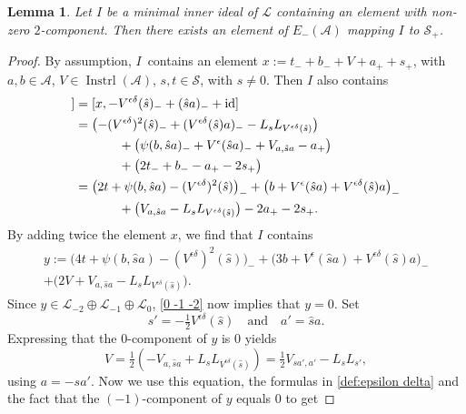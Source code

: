 \documentclass[oneside,a4paper]{amsart} %
\newtheorem{lemma}[theorem]{Lemma}
\theoremstyle{definition}
\DeclareMathOperator{\Inst}{Instrl}
\DeclareMathOperator{\id}{id}
\newcommand{\A}{\mathcal{A}}
\renewcommand{\SS}{\mathcal{S}}
\newcommand{\LL}{\mathcal{L}}
\numberwithin{equation}{section}
\begin{document}
\begin{lemma}
\label{-2 -1 0 1 2}
	Let $I$ be a minimal inner ideal of $\LL$ containing an element with non-zero $2$-component. Then there exists an element of $E_{-}(\A)$ mapping $I$ to $\SS_+$.
\end{lemma}
\begin{proof}
	By assumption, $I$~contains an element $x := t_- + b_- + V + a_+ + s_+$, with $a,b\in \A$, $V\in\Inst(\A)$, $s,t\in \SS$, with $s \neq 0$.
	Then $I$ also contains 
	\begin{align*}
		[x,[x,-\hat s_-]] &= [x, -V^{\epsilon\delta} (\hat s)_- + (\hat s a)_- + \id] \\
				   &= \bigl( -(V^{\epsilon\delta})^2(\hat s)_- + (V^{\epsilon\delta}(\hat s)a)_- - L_sL_{V^{\epsilon\delta}(\hat s)} \bigr) \\
				    & \hspace*{8ex} + \bigl( \psi(b,\hat sa)_- +V^\epsilon(\hat sa)_- + V_{a,\hat sa} - a_+ \bigr) \\
				    & \hspace*{8ex} + \bigl( 2t_- + b_- - a_+ - 2s_+ \bigr) \\
				   &= \bigl( 2t+\psi(b,\hat sa)-(V^{\epsilon\delta})^2(\hat s) \bigr)_- + \bigl( b+V^\epsilon(\hat sa)+V^{\epsilon\delta}(\hat s)a \bigr)_- \\
				    & \hspace*{8ex} + \bigl( V_{a,\hat sa} - L_sL_{V^{\epsilon\delta}(\hat s)} \bigr) - 2a_+ -2s_+ .
	\end{align*}
	By adding twice the element $x$, we find that $I$ contains
	\begin{multline*}
	   y := \bigl( 4t+\psi(b,\hat sa)-(V^{\epsilon\delta})^2(\hat s) \bigr)_- + \bigl( 3b+V^\epsilon(\hat sa)+V^{\epsilon\delta}(\hat s)a \bigr)_- \\
				    + \bigl( 2V + V_{a,\hat sa} - L_sL_{V^{\epsilon\delta}(\hat s)} \bigr) .
	\end{multline*}
	Since $y \in \LL_{-2} \oplus \LL_{-1} \oplus \LL_0$, \cref{0 -1 -2} now implies that $y=0$.
	Set
	\[ s' = -\tfrac{1}{2}V^{\epsilon\delta} (\hat s) \quad \text{and} \quad a'=\hat sa. \]
	Expressing that the $0$-component of $y$ is $0$ yields
	\begin{equation}\label{eq-V}
	   V = \tfrac{1}{2} (-V_{a,\hat sa}+L_sL_{V^{\epsilon\delta}(\hat s)}) = \tfrac{1}{2} V_{sa',a'} - L_sL_{s'},
	\end{equation}
	using $a=-sa'$.
	Now we use this equation, the formulas in \cref{def:epsilon delta} and the fact that the $(-1)$-component of $y$ equals $0$ to get

\end{proof}
\end{document}
